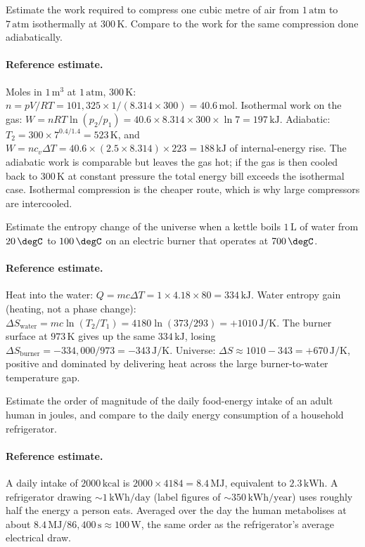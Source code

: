\begin{exercise}
Estimate the work required to compress one cubic metre of air from
$1\,\text{atm}$ to $7\,\text{atm}$ isothermally at $300\,\si{\kelvin}$.
Compare to the work for the same compression done adiabatically.
\paragraph{Reference estimate.} Moles in $1\,\text{m}^3$ at $1\,\text{atm}$,
$300\,\si{\kelvin}$: $n = pV/RT = 101{,}325 \times 1/(8.314 \times 300)
= 40.6\,\text{mol}$. Isothermal work on the gas:
$W = nRT\ln(p_2/p_1) = 40.6 \times 8.314 \times 300 \times \ln 7 =
197\,\text{kJ}$. Adiabatic: $T_2 = 300 \times 7^{0.4/1.4} = 523\,
\si{\kelvin}$, and $W = n c_v \Delta T = 40.6 \times (2.5 \times 8.314)
\times 223 = 188\,\text{kJ}$ of internal-energy rise. The adiabatic
work is comparable but leaves the gas hot; if the gas is then cooled
back to $300\,\si{\kelvin}$ at constant pressure the total energy bill
exceeds the isothermal case. Isothermal compression is the cheaper
route, which is why large compressors are intercooled.
\end{exercise}

\begin{exercise}
Estimate the entropy change of the universe when a kettle boils
$1\,\text{L}$ of water from $20\,\degC$ to $100\,\degC$ on an
electric burner that operates at $700\,\degC$.
\paragraph{Reference estimate.} Heat into the water:
$Q = m c \Delta T = 1 \times 4.18 \times 80 = 334\,\text{kJ}$. Water
entropy gain (heating, not a phase change):
$\Delta S_{\text{water}} = mc\ln(T_2/T_1) = 4180\ln(373/293) =
+1010\,\text{J}/\si{\kelvin}$. The burner surface at $973\,\si{\kelvin}$
gives up the same $334\,\text{kJ}$, losing
$\Delta S_{\text{burner}} = -334{,}000/973 = -343\,\text{J}/
\si{\kelvin}$. Universe:
$\Delta S \approx 1010 - 343 = +670\,\text{J}/\si{\kelvin}$, positive
and dominated by delivering heat across the large burner-to-water
temperature gap.
\end{exercise}

\begin{exercise}
Estimate the order of magnitude of the daily food-energy intake of an
adult human in joules, and compare to the daily energy consumption of
a household refrigerator.
\paragraph{Reference estimate.} A daily intake of $2000\,\text{kcal}$
is $2000 \times 4184 = 8.4\,\text{MJ}$, equivalent to $2.3\,\text{kWh}$.
A refrigerator drawing $\sim 1\,\text{kWh}/\text{day}$ (label figures
of $\sim 350\,\text{kWh}/\text{year}$) uses roughly half the energy a
person eats. Averaged over the day the human metabolises at about
$8.4\,\text{MJ}/86{,}400\,\text{s} \approx 100\,\text{W}$, the same
order as the refrigerator's average electrical draw.
\end{exercise}

